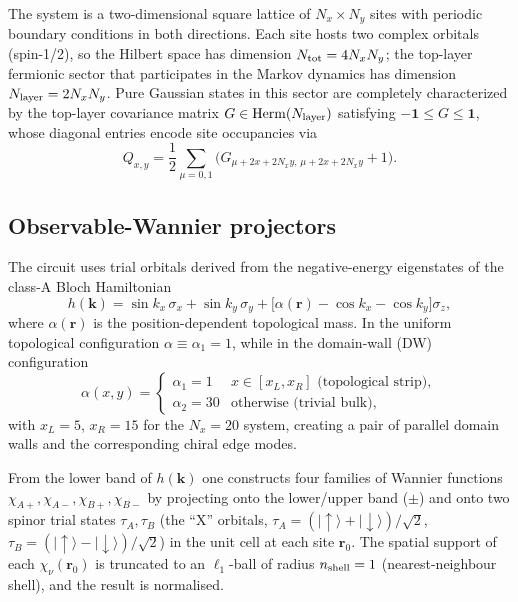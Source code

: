 \documentclass[aps,twocolumn,floatfix,superscriptaddress,nofootinbib]{revtex4-2}
\newcommand{\ket}[1]{|#1\rangle}
\newcommand{\Nlayer}{N_{\rm layer}}
\newcommand{\Ntot}{N_{\rm tot}}
\begin{document}
The system is a two-dimensional square lattice of $N_x\times N_y$ sites with
periodic boundary conditions in both directions.  Each site hosts two complex
orbitals (spin-1/2), so the Hilbert space has dimension $\Ntot=4N_xN_y$; the
top-layer fermionic sector that participates in the Markov dynamics has
dimension $\Nlayer=2N_xN_y$.  Pure Gaussian states in this sector are
completely characterized by the top-layer covariance matrix
$G\in\mathrm{Herm}(\Nlayer)$ satisfying $-\mathbf{1}\leq G\leq\mathbf{1}$,
whose diagonal entries encode site occupancies via
\begin{equation}
  Q_{x,y} = \frac{1}{2}\sum_{\mu=0,1}\bigl(G_{\mu+2x+2N_xy,\,\mu+2x+2N_xy}+1\bigr).
\end{equation}

\subsection{Observable-Wannier projectors}
The circuit uses trial orbitals derived from the negative-energy eigenstates of
the class-A Bloch Hamiltonian
\begin{equation}
  h(\mathbf{k})=\sin k_x\,\sigma_x+\sin k_y\,\sigma_y
                +\bigl[\alpha(\mathbf{r})-\cos k_x-\cos k_y\bigr]\sigma_z,
\end{equation}
where $\alpha(\mathbf{r})$ is the position-dependent topological mass.  In the
uniform topological configuration $\alpha\equiv\alpha_1=1$, while in the
domain-wall (DW) configuration
\begin{equation}
  \alpha(x,y)=
  \begin{cases}
    \alpha_1=1  & x\in[x_L,x_R] \text{ (topological strip)},\\
    \alpha_2=30 & \text{otherwise (trivial bulk)},
  \end{cases}
\end{equation}
with $x_L=5$, $x_R=15$ for the $N_x=20$ system, creating a pair of
parallel domain walls and the corresponding chiral edge modes.

From the lower band of $h(\mathbf{k})$ one constructs four families of
Wannier functions $\chi_{A+},\chi_{A-},\chi_{B+},\chi_{B-}$ by projecting
onto the lower/upper band ($\pm$) and onto two spinor trial states
$\tau_A,\tau_B$ (the ``X'' orbitals, $\tau_A=(\ket\uparrow+\ket\downarrow)/\sqrt{2}$,
$\tau_B=(\ket\uparrow-\ket\downarrow)/\sqrt{2}$) in the unit cell at each site
$\mathbf{r}_0$.  The spatial support of each $\chi_{\nu}(\mathbf{r}_0)$ is
truncated to an $\ell_1$-ball of radius $n_{\rm shell}=1$ (nearest-neighbour
shell), and the result is normalised.
\end{document}
